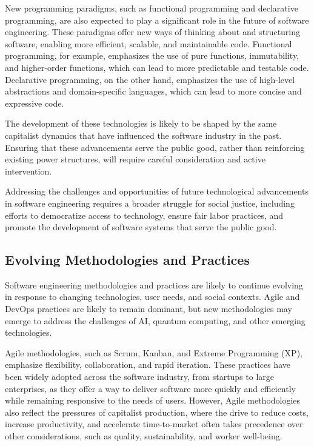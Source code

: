 \begin{refsection}
\begin{multicols}{2}
{New programming paradigms, such as functional programming and declarative programming, are also expected to play a significant role in the future of software engineering. These paradigms offer new ways of thinking about and structuring software, enabling more efficient, scalable, and maintainable code. Functional programming, for example, emphasizes the use of pure functions, immutability, and higher-order functions, which can lead to more predictable and testable code. Declarative programming, on the other hand, emphasizes the use of high-level abstractions and domain-specific languages, which can lead to more concise and expressive code.

The development of these technologies is likely to be shaped by the same capitalist dynamics that have influenced the software industry in the past. Ensuring that these advancements serve the public good, rather than reinforcing existing power structures, will require careful consideration and active intervention.

Addressing the challenges and opportunities of future technological advancements in software engineering requires a broader struggle for social justice, including efforts to democratize access to technology, ensure fair labor practices, and promote the development of software systems that serve the public good.

\subsection{Evolving Methodologies and Practices}

Software engineering methodologies and practices are likely to continue evolving in response to changing technologies, user needs, and social contexts. Agile and DevOps practices are likely to remain dominant, but new methodologies may emerge to address the challenges of AI, quantum computing, and other emerging technologies.

Agile methodologies, such as Scrum, Kanban, and Extreme Programming (XP), emphasize flexibility, collaboration, and rapid iteration. These practices have been widely adopted across the software industry, from startups to large enterprises, as they offer a way to deliver software more quickly and efficiently while remaining responsive to the needs of users. However, Agile methodologies also reflect the pressures of capitalist production, where the drive to reduce costs, increase productivity, and accelerate time-to-market often takes precedence over other considerations, such as quality, sustainability, and worker well-being.

}
\end{multicols}
\end{refsection}
